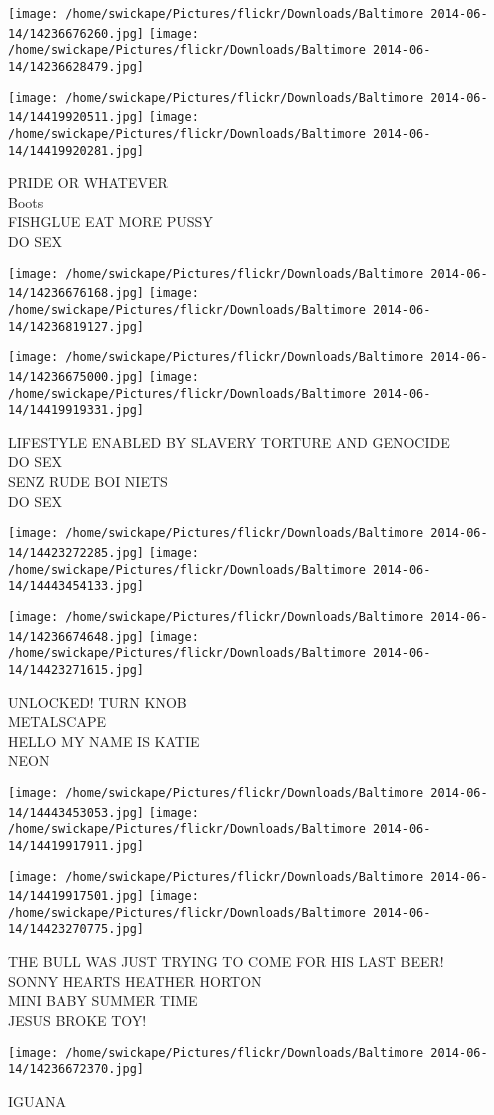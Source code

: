 \documentclass[10pt,letterpaper]{article}
\begin{document}
\texttt{[image: /home/swickape/Pictures/flickr/Downloads/Baltimore 2014-06-14/14236676260.jpg]}
\texttt{[image: /home/swickape/Pictures/flickr/Downloads/Baltimore 2014-06-14/14236628479.jpg]}

\texttt{[image: /home/swickape/Pictures/flickr/Downloads/Baltimore 2014-06-14/14419920511.jpg]}
\texttt{[image: /home/swickape/Pictures/flickr/Downloads/Baltimore 2014-06-14/14419920281.jpg]}

PRIDE OR WHATEVER\\
Boots\\
FISHGLUE EAT MORE PUSSY\\
DO SEX
\pagebreak

\texttt{[image: /home/swickape/Pictures/flickr/Downloads/Baltimore 2014-06-14/14236676168.jpg]}
\texttt{[image: /home/swickape/Pictures/flickr/Downloads/Baltimore 2014-06-14/14236819127.jpg]}

\texttt{[image: /home/swickape/Pictures/flickr/Downloads/Baltimore 2014-06-14/14236675000.jpg]}
\texttt{[image: /home/swickape/Pictures/flickr/Downloads/Baltimore 2014-06-14/14419919331.jpg]}

LIFESTYLE ENABLED BY SLAVERY TORTURE AND GENOCIDE\\
DO SEX\\
SENZ RUDE BOI NIETS\\
DO SEX
\pagebreak

\texttt{[image: /home/swickape/Pictures/flickr/Downloads/Baltimore 2014-06-14/14423272285.jpg]}
\texttt{[image: /home/swickape/Pictures/flickr/Downloads/Baltimore 2014-06-14/14443454133.jpg]}

\texttt{[image: /home/swickape/Pictures/flickr/Downloads/Baltimore 2014-06-14/14236674648.jpg]}
\texttt{[image: /home/swickape/Pictures/flickr/Downloads/Baltimore 2014-06-14/14423271615.jpg]}

UNLOCKED!  TURN KNOB\\
METALSCAPE\\
HELLO MY NAME IS KATIE\\
NEON
\pagebreak

\texttt{[image: /home/swickape/Pictures/flickr/Downloads/Baltimore 2014-06-14/14443453053.jpg]}
\texttt{[image: /home/swickape/Pictures/flickr/Downloads/Baltimore 2014-06-14/14419917911.jpg]}

\texttt{[image: /home/swickape/Pictures/flickr/Downloads/Baltimore 2014-06-14/14419917501.jpg]}
\texttt{[image: /home/swickape/Pictures/flickr/Downloads/Baltimore 2014-06-14/14423270775.jpg]}

THE BULL WAS JUST TRYING TO COME FOR HIS LAST BEER!\\
SONNY HEARTS HEATHER HORTON\\
MINI BABY SUMMER TIME\\
JESUS BROKE TOY!
\pagebreak

\texttt{[image: /home/swickape/Pictures/flickr/Downloads/Baltimore 2014-06-14/14236672370.jpg]}

IGUANA
\pagebreak
\end{document}
